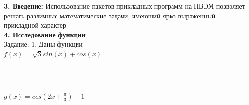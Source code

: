\documentclass[russian,utf8,nocolumnxxxi,nocolumnxxxii]{eskdtext}
\begin{document}
\newpage
\begin{equation}\label{3}
\end{equation}

{\bf3. Введение:} Использование пакетов прикладных программ на ПВЭМ позволяет решать различные математические задачи, имеющий ярко выраженный прикладной характер
\newpage
\begin{equation}\label{4}
\end{equation}
{\bf4. Исследование функции}
\\Задание: 1. Даны функции
\\$f(x)=\sqrt{3}sin(x)+cos(x)$

\begin{figure}[H]
\begin{center}
\begin{minipage}[h]{0.65\linewidth}
  \\
\end{minipage}
\end{center}
\end{figure}

\\$g(x)=cos(2x+\frac{\pi}{3})-1$

\begin{figure}[H]
\begin{center}
\begin{minipage}[h]{0.65\linewidth}
  \\
\end{minipage}
\end{center}
\end{figure}
\end{document}
